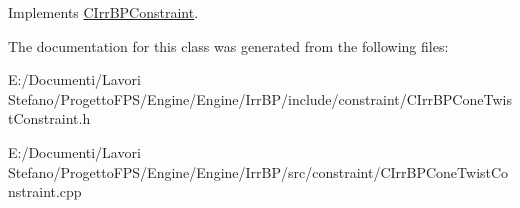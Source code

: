 Implements \hyperlink{class_c_irr_b_p_constraint_a2718ef7118d60646a5cfa2dfe5a44795}{CIrrBPConstraint}.



The documentation for this class was generated from the following files:\begin{DoxyCompactItemize}
\item 
E:/Documenti/Lavori Stefano/ProgettoFPS/Engine/Engine/IrrBP/include/constraint/CIrrBPConeTwistConstraint.h\item 
E:/Documenti/Lavori Stefano/ProgettoFPS/Engine/Engine/IrrBP/src/constraint/CIrrBPConeTwistConstraint.cpp\end{DoxyCompactItemize}
